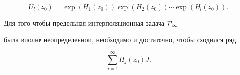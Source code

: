 \begin{equation}


U_l (z_0)=\exp (H_1 (z_0))\exp (H_2 (z_0))


\dotsb \exp (H_l (z_0)).


\end{equation}





\begin{thm}


Для того чтобы предельная интерполяционная задача ${\cal P}_{\infty }$


была вполне неопределенной, необходимо и достаточно, чтобы сходился ряд


\begin{equation}


\sum _{j=1}^{\infty } H_j (z_0)J.


\end{equation}


\end{thm}





